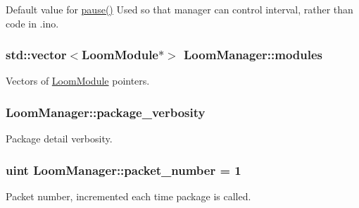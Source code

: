 Default value for \hyperlink{class_loom_manager_a3e57c97dd28717002cf11a1cff794239}{pause()} Used so that manager can control interval, rather than code in .ino. 

\subsubsection[{\texorpdfstring{modules}{modules}}]{\setlength{\rightskip}{0pt plus 5cm}std\+::vector$<${\bf Loom\+Module}$\ast$$>$ Loom\+Manager\+::modules\hspace{0.3cm}{\ttfamily [protected]}}\hypertarget{class_loom_manager_a2880117fb788e2210560e87ed655cb8e}{}\label{class_loom_manager_a2880117fb788e2210560e87ed655cb8e}


Vectors of \hyperlink{class_loom_module}{Loom\+Module} pointers. 

\subsubsection[{\texorpdfstring{package\+\_\+verbosity}{package_verbosity}}]{ Loom\+Manager\+::package\+\_\+verbosity\hspace{0.3cm}{\ttfamily [protected]}}\hypertarget{class_loom_manager_a7e57c09ed534c554f96c457127294f20}{}\label{class_loom_manager_a7e57c09ed534c554f96c457127294f20}


Package detail verbosity. 

\subsubsection[{\texorpdfstring{packet\+\_\+number}{packet_number}}]{\setlength{\rightskip}{0pt plus 5cm}uint Loom\+Manager\+::packet\+\_\+number = 1\hspace{0.3cm}{\ttfamily [protected]}}\hypertarget{class_loom_manager_a7537185cd89f2b472d338268fa2418c9}{}\label{class_loom_manager_a7537185cd89f2b472d338268fa2418c9}


Packet number, incremented each time package is called. 

